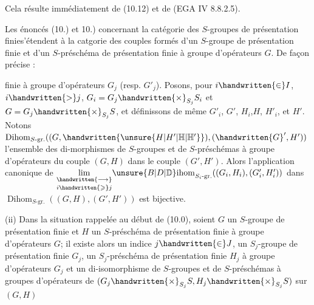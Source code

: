 Cela résulte immédiatement de (10.12) et de (EGA IV 8.8.2.5).

Les énoncés (10.) et \inserted{\handwritten{(}}10.) concernant la catégorie des $S$-groupes de présentation finie\handwritten{[}s'étendent à la catgorie des couples formés d'un $S$-groupe de présentation finie et d'un  $S$-préschéma de présentation finie à groupe d'opérateurs $G$. De façon précise :

finie à groupe d'opérateurs $G_j$ (resp. $G'_j$). Posons, pour $i\handwritten{\in}I$, $i\handwritten{>}j$, $G_i=G_j\handwritten{\times}_{S_j}S_i$ et $G=G_j\handwritten{\times}_{S_j}S$, et définissons de même $G'_i$, $G'$, $H_i$,$H$, $H'_i$, et $H'$. Notons $\operatorname{Dihom}_{S\text{-gr.}}((G,\handwritten{\unsure{H|H'|\mathbb{H}|\mathbb{H}'}}),(\handwritten{G}',H'))$ l'ensemble des di-morphismes de $S$-groupes et de $S$-préschémas à groupe d'opérateurs du couple $(G,H)$ dans le couple $(G',H')$. Alors l'application canonique de $\underset{i\handwritten{\geqslant}j}{\underset{\handwritten{\longrightarrow}}{\lim}}{\unsure{B|D|\mathbb{D}}\mathrm{ihom}}_{S_i\text{-gr.}}((G_i,H_i),(G'_i,H'_i))$ dans $\operatorname{Dihom}_{S\text{-gr.}}((G,H),(G',H'))$ est bijective.

(ii) Dans la situation rappelée au début de (10.0), soient $G$ un $S$-groupe  de présentation finie et $H$ un $S$-préschéma de présentation finie à groupe d'opérateurs $G$; il existe alors un indice $j\handwritten{\in}J$, un $S_j$-groupe de présentation finie $G_j$, un $S_j$-préschéma de présentation finie $H_j$ à groupe d'opérateurs $G_j$ et un di-isomorphisme de $S$-groupes et de $S$-préschémas à groupes d'opérateurs de $(G_j\handwritten{\times}_{S_j}S,H_j\handwritten{\times}_{S_j}S)$ sur$(G,H)$

